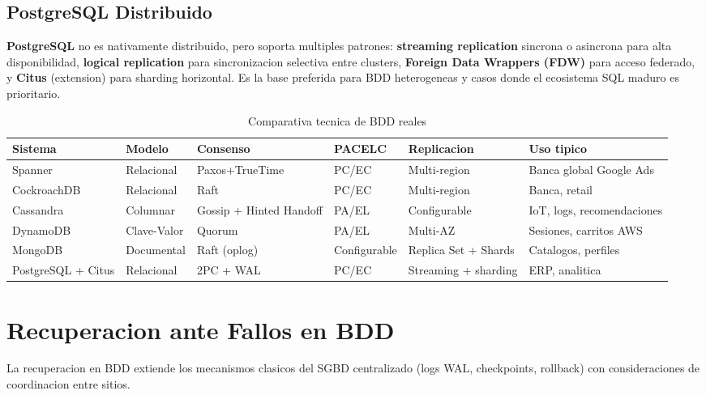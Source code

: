 \documentclass[11pt,a4paper]{article}
\begin{document}
\subsection{PostgreSQL Distribuido}

\textbf{PostgreSQL} no es nativamente distribuido, pero soporta multiples patrones: \textbf{streaming replication} sincrona o asincrona para alta disponibilidad, \textbf{logical replication} para sincronizacion selectiva entre clusters, \textbf{Foreign Data Wrappers (FDW)} para acceso federado, y \textbf{Citus} (extension) para sharding horizontal. Es la base preferida para BDD heterogeneas y casos donde el ecosistema SQL maduro es prioritario.

\begin{table}[H]
\centering
\caption{Comparativa tecnica de BDD reales}
\footnotesize
\renewcommand{\arraystretch}{1.25}
\begin{tabularx}{\textwidth}{lllllX}
\toprule
\textbf{Sistema} & \textbf{Modelo} & \textbf{Consenso} & \textbf{PACELC} & \textbf{Replicacion} & \textbf{Uso tipico} \\
\midrule
Spanner & Relacional & Paxos+TrueTime & PC/EC & Multi-region & Banca global Google Ads \\
CockroachDB & Relacional & Raft & PC/EC & Multi-region & Banca, retail \\
Cassandra & Columnar & Gossip + Hinted Handoff & PA/EL & Configurable & IoT, logs, recomendaciones \\
DynamoDB & Clave-Valor & Quorum & PA/EL & Multi-AZ & Sesiones, carritos AWS \\
MongoDB & Documental & Raft (oplog) & Configurable & Replica Set + Shards & Catalogos, perfiles \\
PostgreSQL + Citus & Relacional & 2PC + WAL & PC/EC & Streaming + sharding & ERP, analitica \\
\bottomrule
\end{tabularx}
\label{tab:sistemasreales}
\end{table}

\section{Recuperacion ante Fallos en BDD}

La recuperacion en BDD extiende los mecanismos clasicos del SGBD centralizado (logs WAL, checkpoints, rollback) con consideraciones de coordinacion entre sitios.
\end{document}
